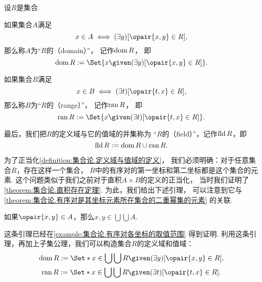 \begin{definition}\label{definition:集合论.定义域与值域的定义}
设\(R\)是集合.

如果集合\(A\)满足\begin{equation*}
	x \in A \iff (\exists y)[\opair{x,y} \in R],
\end{equation*}
那么称\(A\)为“\(R\)的（domain）”，
记作\(\operatorname{dom} R\)，
即\begin{equation*}
	\dom R
	\defeq
	\Set{
		x
		\given
		(\exists y)[\opair{x,y} \in R]
	}.
\end{equation*}

如果集合\(B\)满足\begin{equation*}
	x \in B \iff (\exists t)[\opair{t,x} \in R],
\end{equation*}
那么称\(B\)为“\(R\)的（range）”，
记作\(\operatorname{ran} R\)，
即\begin{equation*}
	\ran R
	\defeq
	\Set{
		x
		\given
		(\exists t)[\opair{t,x} \in R]
	}.
\end{equation*}

最后，我们把\(R\)的定义域与它的值域的并集称为
“\(R\)的（field）”，记作\(\operatorname{fld} R\)，即\begin{equation*}
	\operatorname{fld} R := \operatorname{dom} R \cup \operatorname{ran} R.
\end{equation*}
\end{definition}

为了正当化\cref{definition:集合论.定义域与值域的定义}，
我们必须明确：对于任意集合\(R\)，存在这样一个集合，
\(R\)中的有序对的第一坐标和第二坐标都是这个集合的元素.
这个问题类似于我们之前对于直积\(A \times B\)的定义的正当化，
当时我们证明了\cref{theorem:集合论.直积存在定理}.
为此，我们给出下述引理，
可以注意到它与\cref{theorem:集合论.有序对是其坐标元素所在集合的二重幂集的元素} 的关联.

\begin{lemma}
如果\(\opair{x,y} \in A\)，那么\(x,y \in \bigcup\bigcup A\).
\end{lemma}
这条引理已经在\cref{example:集合论.有序对各坐标的取值范围} 得到证明.
利用这条引理，再加上子集公理，我们可以构造集合\(R\)的定义域和值域：
\begin{gather}
	\dom R
	\defeq
	\Set*{ x \in \bigcup\bigcup R \given (\exists y)[\opair{x,y} \in R] }, \\
	\ran R
	\defeq
	\Set*{ x \in \bigcup\bigcup R \given (\exists t)[\opair{t,x} \in R] }.
\end{gather}

